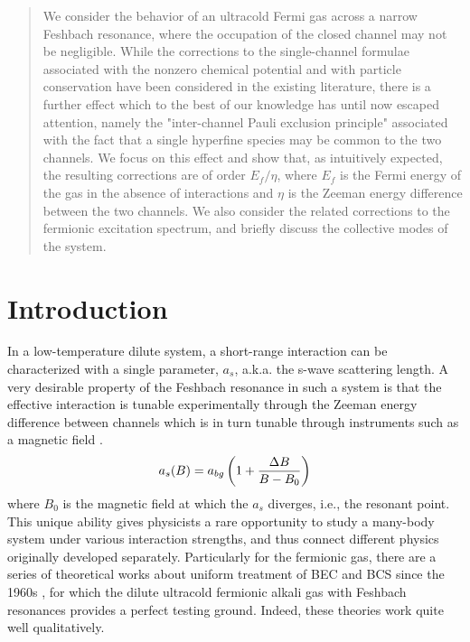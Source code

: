 \documentclass[reprint,pra]{revtex4-1}
\begin{document}
\begin{abstract}
We consider the behavior of an ultracold Fermi gas across a narrow
Feshbach resonance, where the occupation of the closed channel may not be
negligible. While the corrections to the single-channel formulae associated
with the nonzero chemical potential and with particle conservation have
been considered in the existing literature, there is a further effect which
to the best of our knowledge has until now escaped attention, namely the
"inter-channel Pauli exclusion principle" associated with the fact that
a single hyperfine species may be common to the two channels. We focus on
this effect and show that, as intuitively expected, the resulting
corrections are of order $E_f/\eta$, where $E_f$ is the Fermi energy of the gas
in the absence of interactions and $\eta$ is the Zeeman energy difference
between the two channels. We also consider the related corrections
to the fermionic excitation spectrum, and briefly discuss the collective
modes of the system.
\end{abstract}
\maketitle


\section{Introduction}

In a low-temperature dilute system, a short-range interaction can be characterized with a single parameter, $a_s$, a.k.a. the s-wave scattering length.    A very desirable property of the Feshbach resonance in such a system is that the effective interaction is tunable experimentally through the Zeeman energy difference between channels which is in turn  tunable through  instruments such as a magnetic field  \cite{Fano,nuclear,ChinRMP,Pethick}. 
 \begin{equation}
a_{s}(B)=a_{bg}\left(1+\frac{\Delta{B}}{B-B_{0}}\right)
\end{equation}
where $B_{0}$ is the magnetic field at which the $a_{s}$ diverges, i.e., the  resonant point. 
This unique ability gives physicists a rare opportunity to study  a many-body system under various interaction strengths,  and thus connect different physics originally developed separately.  Particularly for the fermionic gas, there are a series of  theoretical works about uniform treatment of  BEC and BCS since the 1960s \cite{Eagle,LeggettCrossover,Nozieres,RanderiaBEC}, for which the dilute ultracold fermionic alkali gas with  Feshbach resonances provides a perfect testing ground.  Indeed,  these theories work quite well  qualitatively.  
\end{document}
